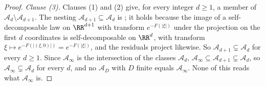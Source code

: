 \begin{proof}
\emph{Clause (3).} Clauses (1) and (2) give, for every integer $d \ge 1$, a member of
$\mathcal{A}_d \setminus \mathcal{A}_{d+1}$. The nesting $\mathcal{A}_{d+1} \subseteq
\mathcal{A}_d$ is ; it holds because the image of a self-decomposable law on
$\RR^{d+1}$ with transform $e^{-F(|\xi|)}$ under the projection on the first $d$ coordinates is
self-decomposable on $\RR^d$, with transform $\xi \mapsto e^{-F(|(\xi,0)|)} = e^{-F(|\xi|)}$, and
the residuals project likewise.
So $\mathcal{A}_{d+1} \subsetneq \mathcal{A}_d$ for every $d \ge 1$. Since $\mathcal{A}_\infty$ is
the intersection of the classes $\mathcal{A}_d$, $\mathcal{A}_\infty \subseteq \mathcal{A}_{d+1}
\subsetneq \mathcal{A}_d$, so $\mathcal{A}_\infty \subsetneq \mathcal{A}_d$ for every $d$, and no
$\mathcal{A}_D$ with $D$ finite equals $\mathcal{A}_\infty$. None of this reads what
$\mathcal{A}_\infty$ is.


\end{proof}
